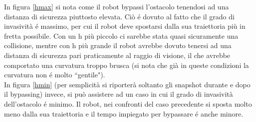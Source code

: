 \documentclass[14pt,a4paper]{extarticle}
\begin{document}
In figura \ref{hmax} si nota come il robot bypassi l'ostacolo tenendosi ad una distanza di sicurezza piuttosto elevata. Ciò é dovuto al fatto che il grado di invasività é massimo, per cui il robot deve spostarsi dalla sua traiettoria più in fretta possibile. Con un h più piccolo ci sarebbe stata quasi sicuramente una collisione, mentre con h più grande il robot avrebbe dovuto tenersi ad una distanza di sicurezza pari praticamente al raggio di visione, il che avrebbe comportato una curvatura troppo brusca (si nota che già in queste condizioni la curvatura non é molto ``gentile").\\
In figura \ref{hmin} (per semplicità si riporterà soltanto gli snapshot durante e dopo il bypassing) invece, si può assistere ad un caso in cui il grado di invasività dell'ostacolo é minimo. Il robot, nei confronti del caso precedente si sposta molto meno dalla sua traiettoria e il tempo impiegato per bypassare é anche minore.
\end{document}
